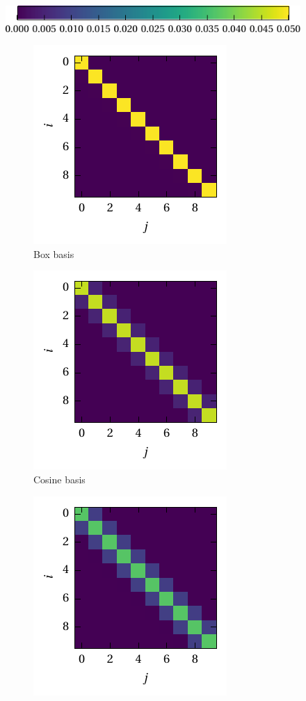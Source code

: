 \documentclass[a4paper,11pt]{article}
\begin{document}
\begin{figure}
	\centering%
	\includegraphics{media/inner_prod_cbar.pdf}\\[0.5cm]
	\begin{subfigure}{0.33\textwidth}%
		\centering%
		\includegraphics{media/basis_box_prod.pdf}%
		\caption{Box basis}%
	\end{subfigure}%
	\begin{subfigure}{0.33\textwidth}%
		\centering%
		\includegraphics{media/basis_cosine_prod.pdf}%
		\caption{Cosine basis}%
	\end{subfigure}%
	\begin{subfigure}{0.33\textwidth}%
		\centering%
		\includegraphics{media/basis_gaussian_prod.pdf}%

\end{subfigure}
\end{figure}
\end{document}
